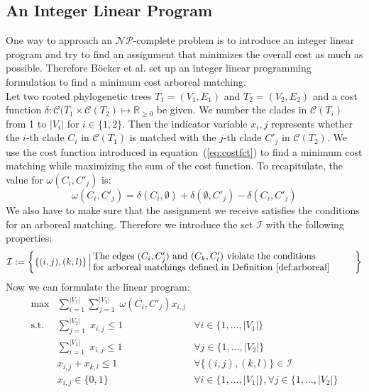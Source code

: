 \subsection{An Integer Linear Program}
One way to approach an $\mathcal{NP}$-complete problem is to introduce an integer linear program and try to find an assignment that minimizes the overall cost as much as possible. Therefore Böcker et al. set up an integer linear programming formulation to find a minimum cost arboreal matching.\\
Let two rooted phylogenetic trees $T_1 = (V_1,E_1)$ and $T_2 = (V_2,E_2)$ and a cost function $\delta: \mathcal{C}(T_1 \times \mathcal{C}(T_2) \mapsto \mathbb{R}_{\geq 0}$ be given. We number the clades in $\mathcal{C}(T_i)$ from 1 to $|V_i|$ for $i \in \{1,2\}$. Then the indicator variable $x_i,j$ represents whether the $i$-th clade $C_i$ in $\mathcal{C}(T_1)$ is matched with the $j$-th clade $C'_j$ in $\mathcal{C}(T_2)$. We use the cost function introduced in equation~(\ref{eq:costfct}) to find a minimum cost matching while maximizing the sum of the cost function. To recapitulate, the value for $\omega(C_i,C'_j)$ is:
$$\omega(C_i,C'_j) = \delta(C_i,\emptyset) + \delta(\emptyset, C'_j) - \delta(C_i,C'_j)$$
We also have to make sure that the assignment we receive satisfies the conditions for an arboreal matching. Therefore we introduce the set $\mathcal{I}$ with the following properties:
\begin{equation*}
\mathcal{I} := \bigg\{ \{(i,j), (k,l)\} \, \Big| \, \parbox{9.8cm}{The edges $(C_i, C'_j)$ and $(C_k, C'_l)$ violate the conditions
\\for arboreal matchings defined in Definition~\ref{def:arboreal}} \bigg\}
\end{equation*}
Now we can formulate the linear program:
\begin{align}
\max &\sum_{i=1}^{|V_1|} \sum_{j=1}^{|V_2|} \; \omega(C_i, C'_j) x_{i,j} \label{eq:max} \\
\text{s.t.} &\sum_{j=1}^{|V_2|} \; x_{i,j} \leq 1 & \forall i \in \{1,...,|V_1|\} \label{eq:V_1} \\
&\sum_{i=1}^{|V_1|} \; x_{i,j} \leq 1 & \forall j \in \{1,...,|V_2|\} \label{eq:V_2} \\
&x_{i,j} + x_{k,l} \leq 1 & \forall \{(i,j), (k,l)\} \in \mathcal{I} \label{eq:arb} \\
&x_{i,j} \in \{0,1\} & \forall i \in \{1,...,|V_1|\}, \forall j \in \{1,...,|V_2|\} \label{eq:int}
\end{align}
